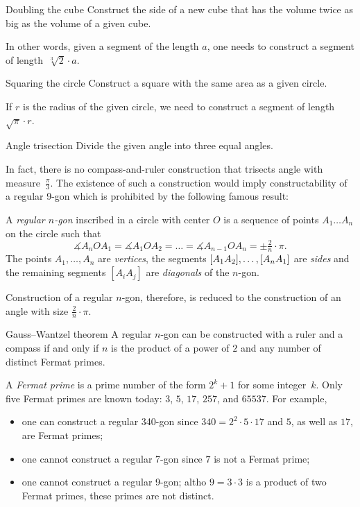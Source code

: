 \begin{thm*}{Doubling the cube}
Construct the side of a new cube 
that has the volume twice as big as the volume of a given cube. 
\end{thm*}

In other words, 
given a segment of the length $a$,
one needs to construct a segment of length~$\sqrt[3]{2}\cdot a$.

\begin{thm*}{Squaring the circle}
Construct a square with the same area as a given circle.
\end{thm*}

If $r$ is the radius of the given circle, we need to construct a segment of length~$\sqrt{\pi}\cdot r$. 

\begin{thm*}{Angle trisection} 
Divide the given angle into three equal angles.
\end{thm*}

In fact, there is no compass-and-ruler construction that trisects angle with measure~$\tfrac\pi3$. 
The existence of such a construction would imply constructability of a regular 9-gon which is prohibited by the following famous result:

A \emph{regular $n$-gon} inscribed in a circle with center $O$ is a sequence of points $A_1\dots A_n$ on the circle such that 
\[\measuredangle A_nOA_1=\measuredangle A_1OA_2=\dots=\measuredangle A_{n-1}OA_n=\pm\tfrac2n\cdot \pi.\]
The points $A_1,\dots, A_n$ are \emph{vertices},
the segments $[A_1A_2], \z\dots, [A_nA_1]$ are \emph{sides} 
and the remaining segments $[A_iA_j]$ are \emph{diagonals} of the $n$-gon.

Construction of a regular $n$-gon, therefore, is reduced to the construction of an angle with size $\tfrac2n\cdot \pi$.

\begin{thm}{Gauss--Wantzel theorem}
A regular $n$-gon can be constructed with a ruler and a compass 
if and only if 
$n$ is the product of a power of $2$ and any number of distinct Fermat primes.
\end{thm}

A \emph{Fermat prime} is a prime number of the form $2^k+1$ for some integer~$k$.
Only five Fermat primes are known  today: $3$, $5$, $17$, $257$, and $65537$.
For example, 
\begin{itemize}
\item one can construct a regular 340-gon since $340=2^2\cdot 5\cdot 17$ and $5$, as well as $17$, are Fermat primes;
\item one cannot construct a regular 7-gon since $7$ is not a Fermat prime;
\item one cannot construct a regular 9-gon; 
altho $9=3\cdot 3$ is a product of two Fermat primes, 
these primes are not distinct.
\end{itemize}

